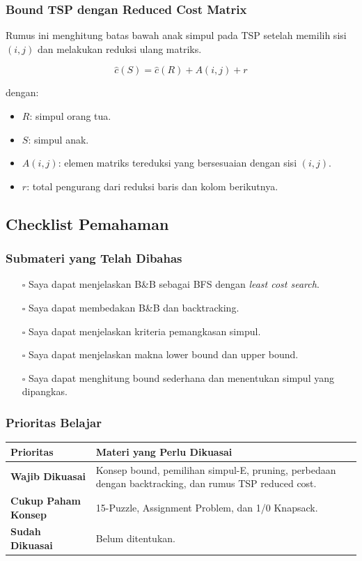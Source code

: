 \subsubsection{Bound TSP dengan Reduced Cost Matrix}
\begin{jawab}
Rumus ini menghitung batas bawah anak simpul pada TSP setelah memilih sisi $(i,j)$ dan melakukan reduksi ulang matriks.
\end{jawab}

\begin{equation}
    \hat{c}(S)=\hat{c}(R)+A(i,j)+r
    \label{eq:tsp-reduced-cost}
\end{equation}

dengan:
\begin{itemize}
    \item $R$: simpul orang tua.
    \item $S$: simpul anak.
    \item $A(i,j)$: elemen matriks tereduksi yang bersesuaian dengan sisi $(i,j)$.
    \item $r$: total pengurang dari reduksi baris dan kolom berikutnya.
\end{itemize}

\subsection{Checklist Pemahaman}
\subsubsection{Submateri yang Telah Dibahas}
\begin{itemize}
    \item[$\square$] Saya dapat menjelaskan B\&B sebagai BFS dengan \textit{least cost search}.
    \item[$\square$] Saya dapat membedakan B\&B dan backtracking.
    \item[$\square$] Saya dapat menjelaskan kriteria pemangkasan simpul.
    \item[$\square$] Saya dapat menjelaskan makna lower bound dan upper bound.
    \item[$\square$] Saya dapat menghitung bound sederhana dan menentukan simpul yang dipangkas.
\end{itemize}

\subsubsection{Prioritas Belajar}
\begin{tabularx}{\textwidth}{|L{0.22\textwidth}|X|}
\hline
\textbf{Prioritas} & \textbf{Materi yang Perlu Dikuasai} \\
\hline
\textbf{Wajib Dikuasai} & Konsep bound, pemilihan simpul-E, pruning, perbedaan dengan backtracking, dan rumus TSP reduced cost. \\
\hline
\textbf{Cukup Paham Konsep} & 15-Puzzle, Assignment Problem, dan 1/0 Knapsack. \\
\hline
\textbf{Sudah Dikuasai} & Belum ditentukan. \\
\hline
\end{tabularx}

